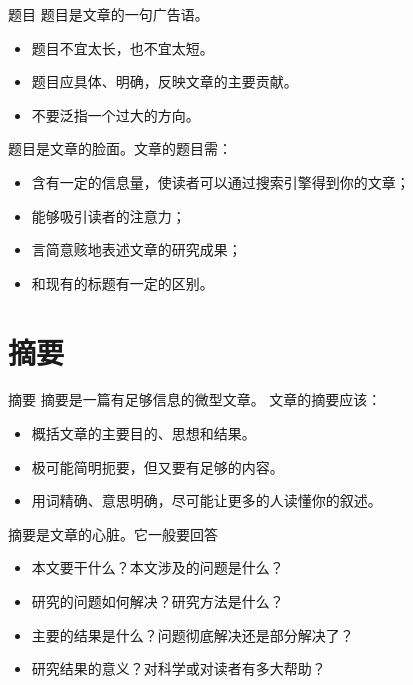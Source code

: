 \documentclass[13pt]{ctexbeamer}
\begin{document}
\begin{frame}{题目}
	题目是文章的一句广告语。
	\begin{itemize}
		\item 题目不宜太长，也不宜太短。
		\item 题目应具体、明确，反映文章的主要贡献。
		\item 不要泛指一个过大的方向。
	\end{itemize}

题目是文章的脸面。文章的题目需：
\begin{itemize}
	\item 含有一定的信息量，使读者可以通过搜索引擎得到你的文章；
	\item 能够吸引读者的注意力；
	\item  言简意赅地表述文章的研究成果；
	\item 和现有的标题有一定的区别。
\end{itemize}
\end{frame}

\section{摘要}
\begin{frame}{摘要}
摘要是一篇有足够信息的微型文章。	文章的摘要应该：
	\begin{itemize}
		\item 概括文章的主要目的、思想和结果。
		\item 极可能简明扼要，但又要有足够的内容。
		\item 用词精确、意思明确，尽可能让更多的人读懂你的叙述。
	\end{itemize}

摘要是文章的心脏。它一般要回答
	\begin{itemize}
		\item 本文要干什么？本文涉及的问题是什么？
		\item 研究的问题如何解决？研究方法是什么？
		\item 主要的结果是什么？问题彻底解决还是部分解决了？
		\item 研究结果的意义？对科学或对读者有多大帮助？
	\end{itemize}

\end{frame}
\end{document}
